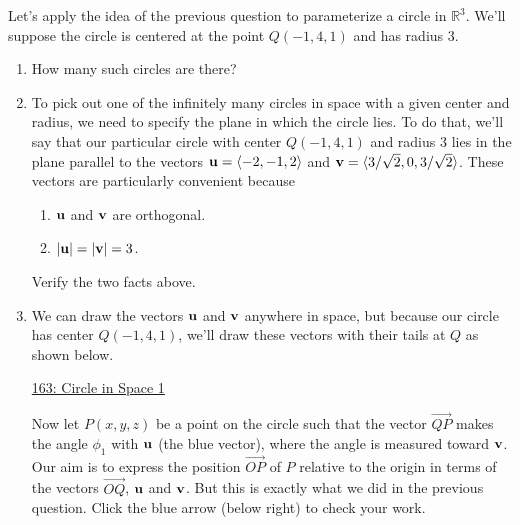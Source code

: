\documentclass{ximera}
\begin{document}
\begin{question}  \label{Qdfrr54r55thlnmvvc}
Let's apply the idea of the previous question to parameterize a circle in $\mathbb{R}^3$. We'll suppose the circle is centered at the point $Q(-1,4,1)$ and has radius $3$. 

\begin{enumerate}

\item{How many such circles are there?
\begin{multipleChoice}
\end{multipleChoice}
}

\item{To pick out one of the infinitely many circles in space with a given center and radius, we need to specify the plane in which the circle lies. To do that, we'll say that our particular circle with center $Q(-1,4,1)$ and radius $3$ lies in the plane parallel to the vectors ${\bf u} = \langle -2, -1, 2 \rangle$ and ${\bf v}= \langle 3/\sqrt{2},0,3/\sqrt{2} \rangle$. These vectors are particularly convenient because
\begin{enumerate}
\item {${\bf u}$ and ${\bf v}$ are orthogonal.}

\item{$|{\bf u}| = |{\bf v}| = 3$.}
\end{enumerate}

\begin{freeResponse}
Verify the two facts above.
\end{freeResponse}
}

\item{We can draw the vectors ${\bf u}$ and ${\bf v}$ anywhere in space, but because our circle has center $Q(-1,4,1)$, we'll draw these vectors with their tails at $Q$ as shown below.

\begin{onlineOnly}
    \begin{center}
\end{center}
\end{onlineOnly}

\href{https://www.desmos.com/3d/ftosqazxfm}{163: Circle in Space 1}

Now let $P(x,y,z)$ be a point on the circle such that the vector $\overrightarrow{QP}$ makes the angle $\phi_1$ with ${\bf u}$ (the blue vector), where the angle is measured toward ${\bf v}$. Our aim is to express the position $\overrightarrow{OP}$ of $P$ relative to the origin in terms of the vectors $\overrightarrow{OQ}$, ${\bf u}$ and ${\bf v}$. But this is exactly what we did in the previous question. Click the blue arrow (below right) to check your work.

}
\end{enumerate}
\end{question}
\end{document}
